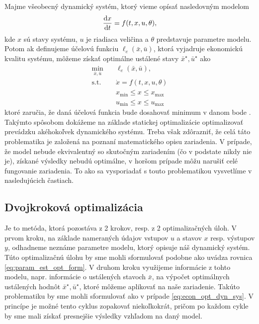 Majme všeobecný dynamický systém, ktorý vieme opísať nasledovným modelom
\begin{equation*}
	\frac{\text{d}x}{\text{d}t} = f(t,x,u,\theta),
\end{equation*}
kde $ x $ sú stavy systému, $ u $ je riadiaca veličina a $ \theta $ predstavuje parametre modelu. Potom ak definujeme účelovú funkciu $ \ell_e(\bar{x},\bar{u}) $, ktorá vyjadruje ekonomickú kvalitu systému, môžeme získať optimálne ustálené stavy $ \bar{x}^{\star}, \bar{u}^{\star} $ ako
\begin{equation}
	\begin{split}
		\min_{\bar{x},\bar{u}}& \quad \ell_e(\bar{x},\bar{u}), \\
		\text{s.t.}& \quad \dot{x} = f(t,x,u,\theta) \\
		& \quad x_{\min} \leq x \leq x_{\max} \\
		& \quad u_{\min} \leq x \leq u_{\max}
	\end{split}
	\label{eq:econ_opt_dyn_sys}
\end{equation}
ktoré zaručia, že daná účelová funkcia bude dosahovať minimum v danom bode \cite{hernandez:economics_opt_w_mismatch:2019}. Takýmto spôsobom dokážeme na základe statickej optimalizácie optimalizovať prevádzku akéhokoľvek dynamického systému. Treba však zdôrazniť, že celá táto problematika je založená na poznaní matematického opisu zariadenia. V prípade, že model nebude ekvivalentný so skutočným zariadením (čo v podstate nikdy nie je), získané výsledky nebudú optimálne, v horšom prípade môžu narušiť celé fungovanie zariadenia. To ako sa vysporiadať s touto problematikou vysvetlíme v nasledujúcich častiach.

\subsection{Dvojkroková optimalizácia}
Je to metóda, ktorá pozostáva z 2 krokov, resp. z 2 optimalizačných úloh. V prvom kroku, na základe nameraných údajov vstupov $ u $ a stavov $ x $ resp. výstupov $ y $, odhadneme neznáme parametre modelu, ktorý opisuje náš dynamický systém. Túto optimalizačnú úlohu by sme mohli sformulovať podobne ako uvádza rovnica \ref{eq:param_est_opt_form}. V druhom kroku využijeme informácie z tohto modelu, napr. informácie o ustálených stavoch $ \bar{x} $, na výpočet optimálnych ustálených hodnôt $ \bar{x}^{\star}, \bar{u}^{\star} $, ktoré môžeme aplikovať na naše zariadenie. Takúto problematiku by sme mohli sformulovať ako v prípade \ref{eq:econ_opt_dyn_sys}. V princípe je možné tento cyklus zopakovať niekoľkokrát, pričom po každom cykle by sme mali získať presnejšie výsledky vzhľadom na daný model.


